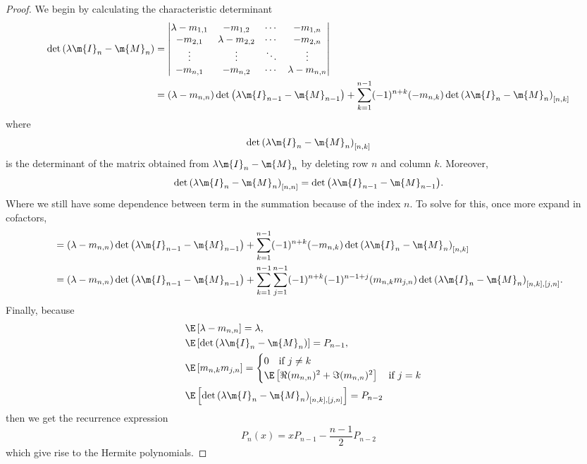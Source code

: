 \begin{proof}
	We begin by calculating the characteristic determinant
	\begin{align}
		\det{\left( \lambda \m{I}_n - \m{M}_n \right)} & = 
		\begin{vmatrix}
			\lambda - m_{1,1} & - m_{1,2} & \cdots & - m_{1,n} \\
			- m_{2,1} & \lambda - m_{2,2} & \cdots & - m_{2,n} \\
			\vdots & \vdots & \ddots & \vdots \\
			- m_{n,1} &  - m_{n,2} & \cdots & \lambda - m_{n,n} \\				
		\end{vmatrix} \\
		& = (\lambda - m_{n,n})\det{\left(\lambda \m{I}_{n-1} - \m{M}_{n-1} \right)} + \sum_{k=1}^{n-1} (-1)^{n+k} (-m_{n,k}) \det{\left(\lambda \m{I}_{n} - \m{M}_{n} \right)_{[n,k]}}
	\end{align}
	where
	\begin{equation}
		\det{\left(\lambda \m{I}_{n} - \m{M}_{n} \right)_{[n,k]}}
	\end{equation}
	is the determinant of the matrix obtained from $\lambda \m{I}_{n} - \m{M}_{n}$ by deleting row $n$ and column $k$. Moreover, 
	\begin{equation}
			\det{\left(\lambda \m{I}_{n} - \m{M}_{n} \right)_{[n,n]}} = \det{\left(\lambda \m{I}_{n-1} - \m{M}_{n-1} \right)}.
	\end{equation}
	Where we still have some dependence between term in the summation because of the index $n$. To solve for this, once more expand in cofactors, 
		\begin{align}
		& = (\lambda - m_{n,n})\det{\left(\lambda \m{I}_{n-1} - \m{M}_{n-1} \right)} + \sum_{k=1}^{n-1} (-1)^{n+k} (-m_{n,k}) \det{\left(\lambda \m{I}_{n} - \m{M}_{n} \right)_{[n,k]}} \\
		& = (\lambda - m_{n,n})\det{\left(\lambda \m{I}_{n-1} - \m{M}_{n-1} \right)} + \sum_{k=1}^{n-1} \sum_{j=1}^{n-1} (-1)^{n+k} (-1)^{n-1+j} (m_{n,k} m_{j, n}) \det{\left(\lambda \m{I}_{n} - \m{M}_{n} \right)_{[n,k], [j,n]}}.
	\end{align}
	Finally, because
	\begin{align}
		& \E\left[ \lambda - m_{n,n} \right] = \lambda, \\
		& \E \left[ \det\left( \lambda \m{I}_n - \m{M}_n \right) \right] = P_{n-1}, \\
		& \E \left[ m_{n,k} m_{j, n} \right] =
		\begin{cases}
			0 \quad \text{if} \ j \neq k \\
			\E \left[ \Re(m_{n,n})^2 + \Im(m_{n,n})^2 \right] \quad \text{if} \ j = k
		\end{cases} \\
		& \E \left[ \det{\left(\lambda \m{I}_{n} - \m{M}_{n} \right)_{[n,k], [j,n]}}\right] = P_{n-2}
	\end{align}
	then we get the recurrence expression
	\begin{equation}
		P_n(x) = x P_{n-1} - \frac{n-1}{2} P_{n-2}
	\end{equation}
	which give rise to the Hermite polynomials.
\end{proof}

